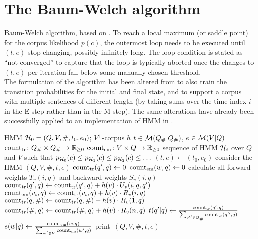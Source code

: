 \section{The Baum-Welch algorithm}

\begin{algorithm}[p!]
 \caption{Baum-Welch algorithm, based on \cite[p.~226]{jm09}. To reach a local
 maximum (or saddle point) for the corpus likelihood $p(c)$, the outermost loop
 needs to be executed until $(t,e)$ stop changing, possibly infinitely long.
 The loop condition is stated as ``not converged'' to capture that the loop is
 typically aborted once the changes to $(t,e)$ per iteration fall below some
 manually chosen threshold.\\[1em]
 The formulation of the algorithm has been altered from \cite{jm09} to also
 train the transition probabilities for the initial and final state, and to
 support a corpus with multiple sentences of different length (by taking sums
 over the time index $i$ in the E-step rather than in the M-step). The same
 alterations have already been successfully applied to an implementation of HMM
 in \cite{nel13}. \label{alg:bw-vogler}}
 \begin{algorithmic}[1]
  \algorithmheader[Input:] HMM $\mathcal H_0 = (Q,V,\#,t_0,e_0)$; $V^+$-corpus $h$
  \algorithmheader[Variables:] $t\in\mathcal M(Q_\#|Q_\#)$, $e\in\mathcal M(V|Q)$
  \algorithmheader             $\operatorname{count}_\mathrm{tr}\colon Q_\#\times Q_\#\to\mathbb R_{\geq0}$
  \algorithmheader             $\operatorname{count}_\mathrm{em}\colon V\times Q\to\mathbb R_{\geq0}$
  \algorithmheader[Output:] sequence of HMM $\mathcal H_i$ over $Q$ and $V$
  \algorithmheader such that $p_{\mathcal H_0}(c) \leq p_{\mathcal H_1}(c) \leq p_{\mathcal H_2}(c) \leq \ldots$
  \STATE $(t,e) \leftarrow (t_0,e_0)$
   \STATE consider the HMM $(Q,V,\#,t,e)$
   \STATE $\operatorname{count}_\mathrm{tr}(q',q) \leftarrow 0$ 
   \STATE $\operatorname{count}_\mathrm{em}(w,q) \leftarrow 0$ 
    \STATE calculate all forward weights $T_v(i,q)$ and backward weights $S_v(i,q)$
      \STATE $\operatorname{count}_\mathrm{tr}(q',q) \leftarrow \operatorname{count}_\mathrm{tr}(q',q) + h(v) \cdot U_v(i,q,q')$
     \ENDFOR
    \ENDFOR
      \STATE $\operatorname{count}_\mathrm{em}(v_i,q) \leftarrow \operatorname{count}_\mathrm{tr}(v_i,q) + h(v) \cdot R_v(i,q)$
     \ENDFOR
    \ENDFOR
     \STATE $\operatorname{count}_\mathrm{tr}(q,\#) \leftarrow \operatorname{count}_\mathrm{tr}(q,\#) + h(v) \cdot R_v(1,q)$
     \STATE $\operatorname{count}_\mathrm{tr}(\#,q) \leftarrow \operatorname{count}_\mathrm{tr}(\#,q) + h(v) \cdot R_v(n,q)$
    \ENDFOR
   \ENDFOR
    \STATE $t(q'|q) \leftarrow \frac{\operatorname{count}_\mathrm{tr}(q',q)}{\sum_{q''\in Q_\#} \operatorname{count}_\mathrm{tr}(q'',q)}$
   \ENDFOR
    \STATE $e(w|q) \leftarrow \frac{\operatorname{count}_\mathrm{em}(w,q)}{\sum_{w'\in V} \operatorname{count}_\mathrm{em}(w',q)}$
   \ENDFOR
   \STATE print~$(Q,V,\#,t,e)$
  \ENDWHILE
 \end{algorithmic}
\end{algorithm}


